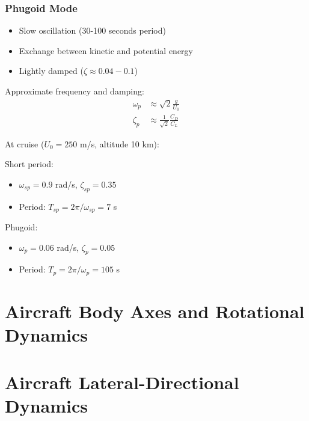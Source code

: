 \subsubsection{Phugoid Mode}
\begin{itemize}
    \item Slow oscillation (30-100 seconds period)
    \item Exchange between kinetic and potential energy
    \item Lightly damped ($\zeta \approx 0.04-0.1$)
\end{itemize}

Approximate frequency and damping:
\begin{align}
\omega_p &\approx \sqrt{2}\frac{g}{U_0} \\
\zeta_p &\approx \frac{1}{\sqrt{2}}\frac{C_D}{C_L}
\end{align}

\begin{examplebox}[title=Example 1.14: Boeing 747 Longitudinal Modes]
At cruise ($U_0 = 250$ m/s, altitude 10 km):

Short period:
\begin{itemize}
    \item $\omega_{sp} = 0.9$ rad/s, $\zeta_{sp} = 0.35$
    \item Period: $T_{sp} = 2\pi/\omega_{sp} = 7$ s
\end{itemize}

Phugoid:
\begin{itemize}
    \item $\omega_p = 0.06$ rad/s, $\zeta_p = 0.05$
    \item Period: $T_p = 2\pi/\omega_p = 105$ s
\end{itemize}
\end{examplebox}

\section{Aircraft Body Axes and Rotational Dynamics}
\label{sec:body_axes}



\section{Aircraft Lateral-Directional Dynamics}
\label{sec:lateral}


